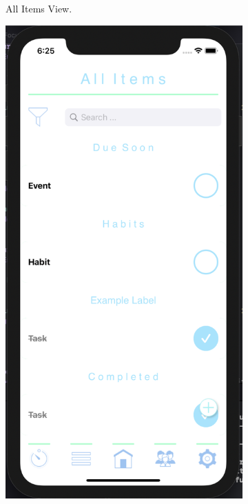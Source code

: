 \begin{figure}[H]
\begin{subfigure}[b]{0.3\textwidth}
        \caption{All Items View.}
        \label{fig:all_items1_app}
    \end{subfigure}
    \hfill
    \begin{subfigure}[b]{0.3\textwidth}
        \centering
        \includegraphics[width=\textwidth]{./graphics/Implementation/All Items/all items2.png}

\end{subfigure}
\end{figure}
